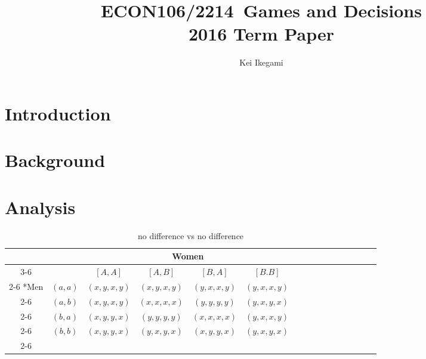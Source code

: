 \documentclass{article}
\begin{document}
\title{ECON106/2214\ Games and Decisions\\ 2016 Term Paper}
\author{Kei Ikegami}
\maketitle

\section{Introduction}

\section{Background}

\section{Analysis}
	
	\begin{table}[h]
	\begin{center}
                \setlength{\extrarowheight}{2pt}
                \begin{tabular}{*{16}{c|}}
                  \multicolumn{2}{c}{} & \multicolumn{1}{c}{} & \multicolumn{2}{c}{Women}\\\cline{3-6}
                  \multicolumn{1}{c}{} &  & $[A, A]$  & $[A, B]$ & $[B, A]$ & $[B.B]$\\\cline{2-6}
                  \multirow{4}*{Men}  & $(a,a)$ & $(x,y,x,y)$ & $(x,y,x,y)$ & $(y,x,x,y)$ & $(y,x,x,y)$\\\cline{2-6}
                  & $(a,b)$ & $(x,y,x,y)$ & $(x,x,x,x)$ & $(y,y,y,y)$ & $(y,x,y,x)$\\\cline{2-6}
                  & $(b,a)$ & $(x,y,y,x)$ & $(y,y,y,y)$ & $(x,x,x,x)$ & $(y,x,x,y)$\\\cline{2-6}
                  & $(b,b)$ & $(x,y,y,x)$ & $(y,x,y,x)$ & $(x,y,y,x)$ & $(y,x,y,x)$\\\cline{2-6}
                \end{tabular}
        \end{center}
        \caption{no difference vs no difference}
  	\end{table}
	
\end{document}
